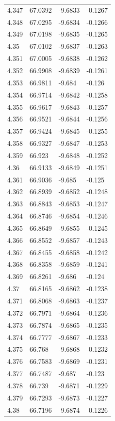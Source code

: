 \begin{tabular}{llll}
4.347 & 67.0392 & -9.6833 & -0.1267 \\
4.348 & 67.0295 & -9.6834 & -0.1266 \\
4.349 & 67.0198 & -9.6835 & -0.1265 \\
4.35 & 67.0102 & -9.6837 & -0.1263 \\
4.351 & 67.0005 & -9.6838 & -0.1262 \\
4.352 & 66.9908 & -9.6839 & -0.1261 \\
4.353 & 66.9811 & -9.684 & -0.126 \\
4.354 & 66.9714 & -9.6842 & -0.1258 \\
4.355 & 66.9617 & -9.6843 & -0.1257 \\
4.356 & 66.9521 & -9.6844 & -0.1256 \\
4.357 & 66.9424 & -9.6845 & -0.1255 \\
4.358 & 66.9327 & -9.6847 & -0.1253 \\
4.359 & 66.923 & -9.6848 & -0.1252 \\
4.36 & 66.9133 & -9.6849 & -0.1251 \\
4.361 & 66.9036 & -9.685 & -0.125 \\
4.362 & 66.8939 & -9.6852 & -0.1248 \\
4.363 & 66.8843 & -9.6853 & -0.1247 \\
4.364 & 66.8746 & -9.6854 & -0.1246 \\
4.365 & 66.8649 & -9.6855 & -0.1245 \\
4.366 & 66.8552 & -9.6857 & -0.1243 \\
4.367 & 66.8455 & -9.6858 & -0.1242 \\
4.368 & 66.8358 & -9.6859 & -0.1241 \\
4.369 & 66.8261 & -9.686 & -0.124 \\
4.37 & 66.8165 & -9.6862 & -0.1238 \\
4.371 & 66.8068 & -9.6863 & -0.1237 \\
4.372 & 66.7971 & -9.6864 & -0.1236 \\
4.373 & 66.7874 & -9.6865 & -0.1235 \\
4.374 & 66.7777 & -9.6867 & -0.1233 \\
4.375 & 66.768 & -9.6868 & -0.1232 \\
4.376 & 66.7583 & -9.6869 & -0.1231 \\
4.377 & 66.7487 & -9.687 & -0.123 \\
4.378 & 66.739 & -9.6871 & -0.1229 \\
4.379 & 66.7293 & -9.6873 & -0.1227 \\
4.38 & 66.7196 & -9.6874 & -0.1226 \\

\end{tabular}
